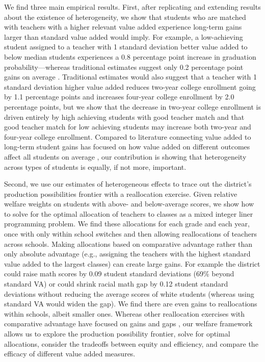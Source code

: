 \documentclass{article}
\theoremstyle{definition}
\theoremstyle{definition}
\theoremstyle{definition}
\theoremstyle{definition}
\begin{document}
    We find three main empirical results. First, after replicating and extending results about the existence of heterogeneity, we show that students who are matched with teachers with a higher relevant value added experience long-term gains larger than standard value added would imply. For example, a low-achieving student assigned to a teacher with 1 standard deviation better value added to below median students experiences a 0.8 percentage point increase in graduation probability---whereas traditional estimates suggest only 0.2 percentage point gains on average \citep[][]{pope2017multidimensional}. Traditional estimates would also suggest that a teacher with 1 standard deviation higher value added reduces two-year college enrollment going by 1.1 percentage points and increases four-year college enrollment by 2.0 percentage points, but we show that the decrease in two-year college enrollment is driven entirely by high achieving students with good teacher match and that good teacher match for low achieving students may increase both two-year and four-year college enrollment. Compared to literature connecting value added to long-term student gains has focused on how value added on different outcomes affect all students on average \citep{chetty2014measuring2,pope2017multidimensional,gilraine2021making}, our contribution is showing that heterogeneity across types of students is equally, if not more, important.
    
    Second, we use our estimates of heterogeneous effects to trace out the district’s production possibilities frontier with a reallocation exercise. Given relative welfare weights on students with above- and below-average scores, we show how to solve for the optimal allocation of teachers to classes as a mixed integer liner programming problem. We find these allocations for each grade and each year, once with only within school switches and then allowing reallocations of teachers across schools. Making allocations based on comparative advantage rather than only absolute advantage (e.g., assigning the teachers with the highest standard value added to the largest classes) can create large gains. For example the district could raise math scores by 0.09 student standard deviations (69\% beyond standard VA) or could shrink racial math gap by 0.12 student standard deviations without reducing the average scores of white students (whereas using standard VA would widen the gap). We find there are even gains to reallocations within schools, albeit smaller ones. Whereas other reallocation exercises with comparative advantage have focused on gains and gaps \citep[e.g.,][]{Delgado2020}, our welfare framework allows us to explore the production possibility frontier, solve for optimal allocations,  consider the tradeoffs between equity and efficiency, and compare the efficacy of different value added measures.
    
\end{document}
